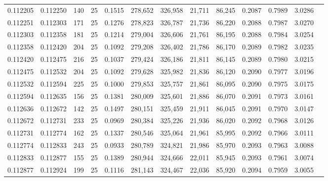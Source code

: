 \begin{tabular}{rrrrrrrrrrrrr}
0.112205 & 0.112250 &   140 &  25 &                                     0.1515 & 278,652 & 326,958 &  21,711 &  86,245 & 0.2087 & 0.7989 & 3.0286 \\
0.112251 & 0.112303 &   171 &  25 &                                     0.1276 & 278,823 & 326,787 &  21,736 &  86,220 & 0.2088 & 0.7987 & 3.0270 \\
0.112303 & 0.112358 &   181 &  25 &                                     0.1214 & 279,004 & 326,606 &  21,761 &  86,195 & 0.2088 & 0.7984 & 3.0254 \\
0.112358 & 0.112420 &   204 &  25 &                                     0.1092 & 279,208 & 326,402 &  21,786 &  86,170 & 0.2089 & 0.7982 & 3.0235 \\
0.112420 & 0.112475 &   216 &  25 &                                     0.1037 & 279,424 & 326,186 &  21,811 &  86,145 & 0.2089 & 0.7980 & 3.0215 \\
0.112475 & 0.112532 &   204 &  25 &                                     0.1092 & 279,628 & 325,982 &  21,836 &  86,120 & 0.2090 & 0.7977 & 3.0196 \\
0.112532 & 0.112594 &   225 &  25 &                                     0.1000 & 279,853 & 325,757 &  21,861 &  86,095 & 0.2090 & 0.7975 & 3.0175 \\
0.112594 & 0.112635 &   156 &  25 &                                     0.1381 & 280,009 & 325,601 &  21,886 &  86,070 & 0.2091 & 0.7973 & 3.0161 \\
0.112636 & 0.112672 &   142 &  25 &                                     0.1497 & 280,151 & 325,459 &  21,911 &  86,045 & 0.2091 & 0.7970 & 3.0147 \\
0.112672 & 0.112731 &   233 &  25 &                                     0.0969 & 280,384 & 325,226 &  21,936 &  86,020 & 0.2092 & 0.7968 & 3.0126 \\
0.112731 & 0.112774 &   162 &  25 &                                     0.1337 & 280,546 & 325,064 &  21,961 &  85,995 & 0.2092 & 0.7966 & 3.0111 \\
0.112774 & 0.112833 &   243 &  25 &                                     0.0933 & 280,789 & 324,821 &  21,986 &  85,970 & 0.2093 & 0.7963 & 3.0088 \\
0.112833 & 0.112877 &   155 &  25 &                                     0.1389 & 280,944 & 324,666 &  22,011 &  85,945 & 0.2093 & 0.7961 & 3.0074 \\
0.112877 & 0.112924 &   199 &  25 &                                     0.1116 & 281,143 & 324,467 &  22,036 &  85,920 & 0.2094 & 0.7959 & 3.0055 \\

\end{tabular}
